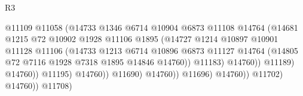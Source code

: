 \begin{lexlean}{R3}
\begin{coremodule}
                                            @11109
                                            @11058
                                            (@14733
                                              @1346
                                              @6714
                                              @10904
                                              @6873
                                              @11108
                                              @14764
                                              (@14681
                                                @1215
                                                @72
                                                @10902
                                                @1928
                                                @11106
                                                @1895
                                                (@14727
                                                  @1214
                                                  @10897
                                                  @10901
                                                  @11128
                                                  @11106
                                                  (@14733
                                                    @1213
                                                    @6714
                                                    @10896
                                                    @6873
                                                    @11127
                                                    @14764
                                                    (@14805
                                                      @72
                                                      @7116
                                                      @1928
                                                      @7318
                                                      @1895
                                                      @14846
                                                      @14760))
                                                  @11183)
                                                @14760))
                                            @11189)
                                          @14760))
                                      @11195)
                                    @14760))
                                @11690)
                              @14760))
                          @11696)
                        @14760))
                    @11702)
                  @14760))
              @11708)

\end{coremodule}
\end{lexlean}
